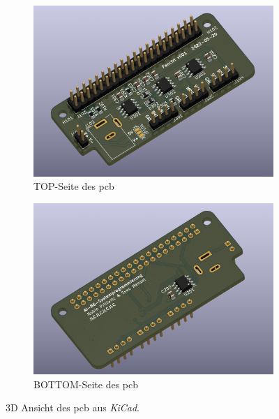 \begin{figure}[H]
    \centering
    \begin{subfigure}{1.0\textwidth}
        \centering
        \includegraphics[width=15cm]{./pic/pcb-3d-top.png}
        \caption{TOP-Seite des \gls{pcb}}
    \end{subfigure}
    \begin{subfigure}{1.0\textwidth}
        \centering
        \includegraphics[width=15cm]{./pic/pcb-3d-bottom.png}
        \caption{BOTTOM-Seite des \gls{pcb}}
    \end{subfigure}
    \caption{3D Ansicht des \gls{pcb} aus \textit{KiCad}.}
    \label{fig:pcb-3d}
\end{figure}
\newpage


